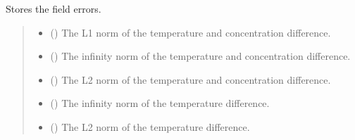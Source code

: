 \documentclass[a4paper,11pt,english,openany]{sphinxmanual}
\begin{document}
\begin{fulllineitems}
\begin{fulllineitems}
\label{\detokenize{api/spyice.postprocess.analysis:src.spyice.postprocess.analysis.Analysis.store_field_errors}}
\pysigstartsignatures
\pysiglinewithargsret
{}
{\sphinxparamcomma {}\sphinxparamcomma {}\sphinxparamcomma {}\sphinxparamcomma {}\sphinxparamcomma {}\sphinxparamcomma {}\sphinxparamcomma {}\sphinxparamcomma {}}
{}
\pysigstopsignatures
\sphinxAtStartPar
Stores the field errors.
\begin{quote}\begin{description}
\begin{itemize}
\item {} 
\sphinxAtStartPar
{} () \textendash{} The L1 norm of the temperature and concentration difference.

\item {} 
\sphinxAtStartPar
{} () \textendash{} The infinity norm of the temperature and concentration difference.

\item {} 
\sphinxAtStartPar
{} () \textendash{} The L2 norm of the temperature and concentration difference.

\item {} 
\sphinxAtStartPar
{} () \textendash{} The infinity norm of the temperature difference.

\item {} 
\sphinxAtStartPar
{} () \textendash{} The L2 norm of the temperature difference.


\end{itemize}
\end{description}
\end{quote}
\end{fulllineitems}
\end{fulllineitems}
\end{document}
